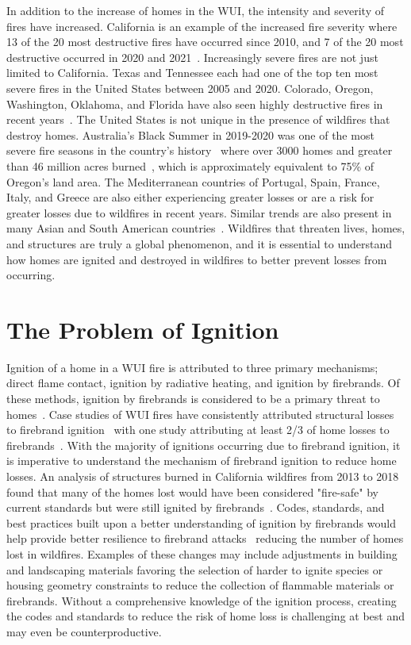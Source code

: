     In addition to the increase of homes in the WUI, the intensity and severity of fires have increased. California is an example of the increased fire severity where 13 of the 20 most destructive fires have occurred since 2010, and 7 of the 20 most destructive occurred in 2020 and 2021~\cite{CALFIRE2018}. Increasingly severe fires are not just limited to California. Texas and Tennessee each had one of the top ten most severe fires in the United States between 2005 and 2020. Colorado, Oregon, Washington, Oklahoma, and Florida have also seen highly destructive fires in recent years~\cite{Barrett2020}. The United States is not unique in the presence of wildfires that destroy homes. Australia's Black Summer in 2019-2020 was one of the most severe fire seasons in the country's history~\cite{Levin2021Unveiling2019/2020} where over 3000 homes and greater than 46 million acres burned~\cite{Filkov2020ImpactTrends}, which is approximately equivalent to 75\% of Oregon's land area. The Mediterranean countries of Portugal, Spain, France, Italy, and Greece are also either experiencing greater losses or are a risk for greater losses due to wildfires in recent years. Similar trends are also present in many Asian and South American countries~\cite{Manzello2018}. Wildfires that threaten lives, homes, and structures are truly a global phenomenon, and it is essential to understand how homes are ignited and destroyed in wildfires to better prevent losses from occurring.

\section{The Problem of Ignition}
    Ignition of a home in a WUI fire is attributed to three primary mechanisms; direct flame contact, ignition by radiative heating, and ignition by firebrands. Of these methods, ignition by firebrands is considered to be a primary threat to homes~\cite{Suzuki2021, Mell2010, Manzello2018FORUMResearch}. Case studies of WUI fires have consistently attributed structural losses to firebrand ignition~\cite{Westhaver2017WhyDisaster, Roberts2021} with one study attributing at least 2/3 of home losses to firebrands~\cite{Mell2011}. With the majority of ignitions occurring due to firebrand ignition, it is imperative to understand the mechanism of firebrand ignition to reduce home losses. An analysis of structures burned in California wildfires from 2013 to 2018 found that many of the homes lost would have been considered "fire-safe" by current standards but were still ignited by firebrands~\cite{Syphard2019}. Codes, standards, and best practices built upon a better understanding of ignition by firebrands would help provide better resilience to firebrand attacks~\cite{Manzello2020} reducing the number of homes lost in wildfires. Examples of these changes may include adjustments in building and landscaping materials favoring the selection of harder to ignite species or housing geometry constraints to reduce the collection of flammable materials or firebrands. Without a comprehensive knowledge of the ignition process, creating the codes and standards to reduce the risk of home loss is challenging at best and may even be counterproductive.  
    
